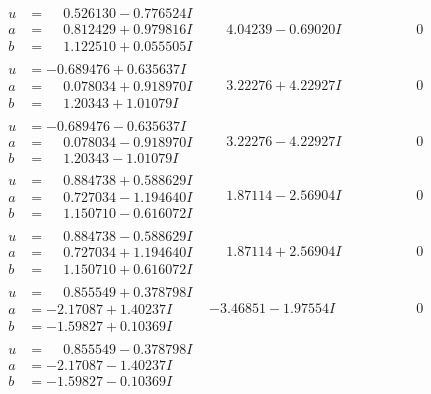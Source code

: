 \documentclass[1p]{elsarticle_modified}
\theoremstyle{definition}
\begin{document}
$$\begin{array}{c|c|c}
\begin{aligned}
u &= \phantom{-}0.526130 - 0.776524 I \\
a &= \phantom{-}0.812429 + 0.979816 I \\
b &= \phantom{-}1.122510 + 0.055505 I\end{aligned}
 & \phantom{-}4.04239 - 0.69020 I & \phantom{-0.000000 } 0 \\ \hline\begin{aligned}
u &= -0.689476 + 0.635637 I \\
a &= \phantom{-}0.078034 + 0.918970 I \\
b &= \phantom{-}1.20343 + 1.01079 I\end{aligned}
 & \phantom{-}3.22276 + 4.22927 I & \phantom{-0.000000 } 0 \\ \hline\begin{aligned}
u &= -0.689476 - 0.635637 I \\
a &= \phantom{-}0.078034 - 0.918970 I \\
b &= \phantom{-}1.20343 - 1.01079 I\end{aligned}
 & \phantom{-}3.22276 - 4.22927 I & \phantom{-0.000000 } 0 \\ \hline\begin{aligned}
u &= \phantom{-}0.884738 + 0.588629 I \\
a &= \phantom{-}0.727034 - 1.194640 I \\
b &= \phantom{-}1.150710 - 0.616072 I\end{aligned}
 & \phantom{-}1.87114 - 2.56904 I & \phantom{-0.000000 } 0 \\ \hline\begin{aligned}
u &= \phantom{-}0.884738 - 0.588629 I \\
a &= \phantom{-}0.727034 + 1.194640 I \\
b &= \phantom{-}1.150710 + 0.616072 I\end{aligned}
 & \phantom{-}1.87114 + 2.56904 I & \phantom{-0.000000 } 0 \\ \hline\begin{aligned}
u &= \phantom{-}0.855549 + 0.378798 I \\
a &= -2.17087 + 1.40237 I \\
b &= -1.59827 + 0.10369 I\end{aligned}
 & -3.46851 - 1.97554 I & \phantom{-0.000000 } 0 \\ \hline\begin{aligned}
u &= \phantom{-}0.855549 - 0.378798 I \\
a &= -2.17087 - 1.40237 I \\
b &= -1.59827 - 0.10369 I\end{aligned}

\end{array}$$
\end{document}
